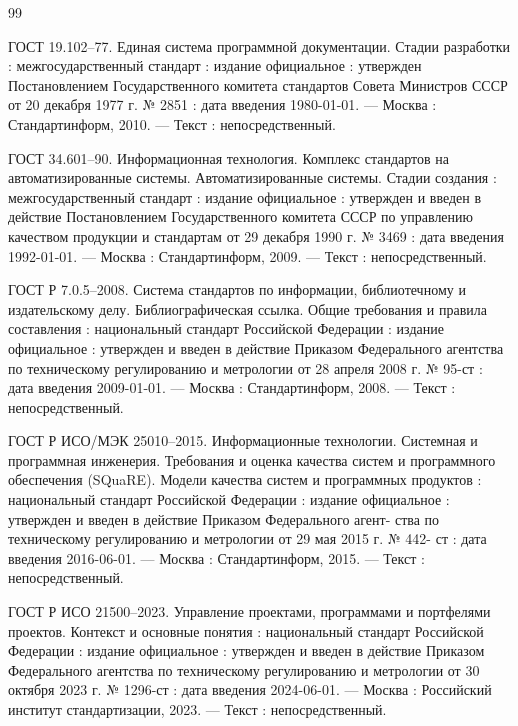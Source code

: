 
\begin{thebibliography}{99}
	
	 ГОСТ 19.102–77. Единая система программной документации. Стадии разработки : межгосударственный стандарт : издание официальное : утвержден Постановлением Государственного комитета стандартов Совета Министров СССР от 20 декабря 1977 г. № 2851 : дата введения 1980-01-01. --- Москва : Стандартинформ, 2010. --- Текст : непосредственный.
	
	 ГОСТ 34.601–90. Информационная технология. Комплекс стандартов на автоматизированные системы. Автоматизированные системы. Стадии создания : межгосударственный стандарт : издание официальное : утвержден и введен в действие Постановлением Государственного комитета СССР по управлению качеством продукции и стандартам от 29 декабря 1990 г. № 3469 : дата введения 1992-01-01. --- Москва : Стандартинформ, 2009. --- Текст : непосредственный.
	
	 ГОСТ Р 7.0.5–2008. Система стандартов по информации, библиотечному и издательскому делу. Библиографическая ссылка. Общие требования и правила составления : национальный стандарт Российской Федерации : издание официальное : утвержден и введен в действие Приказом Федерального агентства по техническому регулированию и метрологии от 28 апреля 2008 г. № 95-ст : дата введения 2009-01-01. --- Москва : Стандартинформ, 2008. --- Текст : непосредственный.
	
	 ГОСТ Р ИСО/МЭК 25010–2015. Информационные технологии. Системная и программная инженерия. Требования и оценка качества систем и
	программного обеспечения (SQuaRE). Модели качества систем и программных продуктов : национальный стандарт Российской Федерации : издание
	официальное : утвержден и введен в действие Приказом Федерального агент-
	ства по техническому регулированию и метрологии от 29 мая 2015 г. № 442-
	ст : дата введения 2016-06-01. --- Москва : Стандартинформ, 2015. --- Текст :	непосредственный.
	
	 ГОСТ Р ИСО 21500–2023. Управление проектами, программами и портфелями проектов. Контекст и основные понятия : национальный стандарт Российской Федерации : издание официальное : утвержден и введен в действие Приказом Федерального агентства по техническому регулированию и метрологии от 30 октября 2023 г. № 1296-ст : дата введения 2024-06-01. --- Москва : Российский институт стандартизации, 2023. --- Текст : непосредственный.
	

\end{thebibliography}
